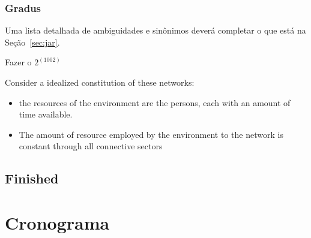 \documentclass[a4paper,openright,12pt]{report} %
\begin{document}
\subsubsection{Gradus}\label{sec:gradus}
Uma lista detalhada de ambiguidades e sinônimos deverá completar o que está na Seção~\ref{sec:jar}.

Fazer o $2^(100 2)$

Consider a idealized constitution of these networks: 
\begin{itemize}
	\item the resources of the environment are the persons, each with an amount of time available.
	\item The amount of resource employed by the environment to the network is constant through all connective sectors
\end{itemize}

\subsection{Finished}


\section{Cronograma}\label{sec:cron}
\end{document}
